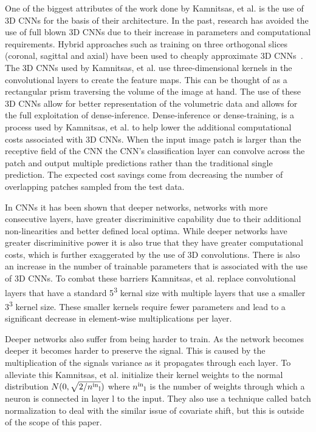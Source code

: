 \documentclass{sig-alternate}
\begin{document}
One of the biggest attributes of the work done by Kamnitsas, et al. is the use of 3D CNNs for the basis of their architecture. In the past, research has avoided the use of full blown 3D CNNs due to their increase in parameters and computational requirements.  Hybrid approaches such as training on three orthogonal slices (coronal, sagittal and axial) have been used to cheaply approximate 3D CNNs~\cite{Roth:2014}. The 3D CNNs used by Kamnitsas, et al. use three-dimensional kernels in the convolutional layers to create the feature maps. This can be thought of as a rectangular prism traversing the volume of the image at hand. The use of these 3D CNNs allow for better representation of the volumetric data and allows for the full exploitation of dense-inference. Dense-inference or dense-training, is a process used by Kamnitsas, et al. to help lower the additional computational costs associated with 3D CNNs. When the input image patch is larger than the receptive field of the CNN the CNN's classification layer can convolve across the patch and output multiple predictions rather than the traditional single prediction. The expected cost savings come from decreasing the number of overlapping patches sampled from the test data.


In CNNs it has been shown that deeper networks, networks with more consecutive layers, have greater discriminitive capability due to their additional non-linearities and better defined local optima. While deeper networks have greater discriminitive power it is also true that they have greater computational costs, which is further exaggerated by the use of 3D convolutions. There is also an increase in the number of trainable parameters that is associated with the use of 3D CNNs. To combat these barriers Kamnitsas, et al. replace convolutional layers that have a standard 5\textsuperscript{3} kernal size with multiple layers that use a smaller 3\textsuperscript{3} kernel size. These smaller kernels require fewer parameters and lead to a significant decrease in element-wise multiplications per layer.~\cite{Kamnitsas:2017}

Deeper networks also suffer from being harder to train. As the network becomes deeper it becomes harder to preserve the signal. This is caused by the multiplication of the signals variance as it propagates through each layer. To alleviate this Kamnitsas, et al. initialize their kernel weights to the normal distribution $N(0,\sqrt{2/n\textsuperscript{in}\textsubscript{l}})$ where $n\textsuperscript{in}\textsubscript{l}$ is the number of weights through which a neuron is connected in layer l to the input. They also use a technique called batch normalization to deal with the similar issue of covariate shift, but this is outside of the scope of this paper.
\end{document}
